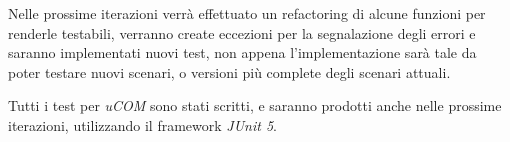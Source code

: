 \documentclass[12pt]{report}
\begin{document}
	Nelle prossime iterazioni verrà effettuato un refactoring di alcune funzioni per renderle testabili, verranno create eccezioni per la segnalazione degli errori e saranno implementati nuovi test, non appena l'implementazione sarà tale da poter testare nuovi scenari, o versioni più complete degli scenari attuali.
	
	Tutti i test per \textit{uCOM} sono stati scritti, e saranno prodotti anche nelle prossime iterazioni, utilizzando il framework \textit{JUnit 5}.
	
	
	
\end{document}
